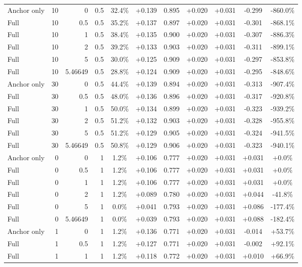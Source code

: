 \begin{table}[htbp]
\begin{tabular}{lrrrccccccc}
Anchor only & 10 & 0 & 0.5 & 32.4\% & +0.139 & 0.895 & +0.020 & +0.031 & -0.299 & -860.0\% \\
Full & 10 & 0.5 & 0.5 & 35.2\% & +0.137 & 0.897 & +0.020 & +0.031 & -0.301 & -868.1\% \\
Full & 10 & 1 & 0.5 & 38.4\% & +0.135 & 0.900 & +0.020 & +0.031 & -0.307 & -886.3\% \\
Full & 10 & 2 & 0.5 & 39.2\% & +0.133 & 0.903 & +0.020 & +0.031 & -0.311 & -899.1\% \\
Full & 10 & 5 & 0.5 & 30.0\% & +0.125 & 0.909 & +0.020 & +0.031 & -0.297 & -853.8\% \\
Full & 10 & 5.46649 & 0.5 & 28.8\% & +0.124 & 0.909 & +0.020 & +0.031 & -0.295 & -848.6\% \\
Anchor only & 30 & 0 & 0.5 & 44.4\% & +0.139 & 0.894 & +0.020 & +0.031 & -0.313 & -907.4\% \\
Full & 30 & 0.5 & 0.5 & 48.0\% & +0.136 & 0.896 & +0.020 & +0.031 & -0.317 & -920.8\% \\
Full & 30 & 1 & 0.5 & 50.0\% & +0.134 & 0.899 & +0.020 & +0.031 & -0.323 & -939.2\% \\
Full & 30 & 2 & 0.5 & 51.2\% & +0.132 & 0.903 & +0.020 & +0.031 & -0.328 & -955.8\% \\
Full & 30 & 5 & 0.5 & 51.2\% & +0.129 & 0.905 & +0.020 & +0.031 & -0.324 & -941.5\% \\
Full & 30 & 5.46649 & 0.5 & 50.8\% & +0.129 & 0.906 & +0.020 & +0.031 & -0.323 & -940.1\% \\
Anchor only & 0 & 0 & 1 & 1.2\% & +0.106 & 0.777 & +0.020 & +0.031 & +0.031 & +0.0\% \\
Full & 0 & 0.5 & 1 & 1.2\% & +0.106 & 0.777 & +0.020 & +0.031 & +0.031 & +0.0\% \\
Full & 0 & 1 & 1 & 1.2\% & +0.106 & 0.777 & +0.020 & +0.031 & +0.031 & +0.0\% \\
Full & 0 & 2 & 1 & 1.2\% & +0.089 & 0.780 & +0.020 & +0.031 & +0.044 & -41.8\% \\
Full & 0 & 5 & 1 & 0.0\% & +0.041 & 0.793 & +0.020 & +0.031 & +0.086 & -177.4\% \\
Full & 0 & 5.46649 & 1 & 0.0\% & +0.039 & 0.793 & +0.020 & +0.031 & +0.088 & -182.4\% \\
Anchor only & 1 & 0 & 1 & 1.2\% & +0.136 & 0.771 & +0.020 & +0.031 & -0.014 & +53.7\% \\
Full & 1 & 0.5 & 1 & 1.2\% & +0.127 & 0.771 & +0.020 & +0.031 & -0.002 & +92.1\% \\
Full & 1 & 1 & 1 & 1.2\% & +0.118 & 0.772 & +0.020 & +0.031 & +0.010 & +66.9\% \\

\end{tabular}
\end{table}
